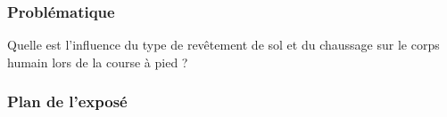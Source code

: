 \begin{frame}
    \titlepage
\end{frame}

\begin{frame}
    \frametitle{Problématique}
    Quelle est l'influence du type de revêtement de sol et du chaussage sur le corps humain lors de la course à pied ?
\end{frame}

\begin{frame}
    \frametitle{Plan de l'exposé}
    \tableofcontents
\end{frame}

